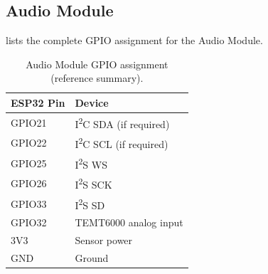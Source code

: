 \subsection{Audio Module}
\label{sec:complete-gpio-audio}

 lists the complete GPIO assignment for the Audio Module.

\begin{table}[H]
\centering
\caption{Audio Module GPIO assignment (reference summary).}
\label{tab:audio-gpio-ref}
\small
\begin{tabularx}{\columnwidth}{@{}l Y@{}}
\toprule
\textbf{ESP32 Pin} & \textbf{Device} \\
\midrule
GPIO21 & I\textsuperscript{2}C SDA (if required) \\
GPIO22 & I\textsuperscript{2}C SCL (if required) \\
GPIO25 & I\textsuperscript{2}S WS \\
GPIO26 & I\textsuperscript{2}S SCK \\
GPIO33 & I\textsuperscript{2}S SD \\
GPIO32 & TEMT6000 analog input \\
3V3 & Sensor power \\
GND & Ground \\
\bottomrule
\end{tabularx}
\end{table}
